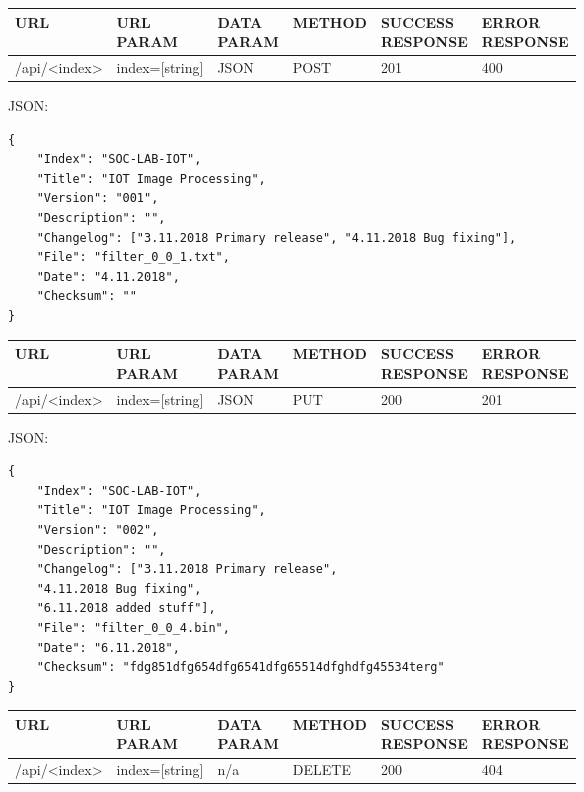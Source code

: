 \begin{table}[h]
    \begin{tabular}[h]{llllll}
    URL          & \specialcell{URL\\PARAM}     & \specialcell{DATA\\PARAM}  & METHOD &  \specialcell{SUCCESS\\RESPONSE} & \specialcell{ERROR\\RESPONSE} \\ \hline
    /api/<index> & index=[string] & JSON    & POST   & 201              & 400            \\ 
    \end{tabular}
\end{table}

JSON:
\begin{verbatim}
{
    "Index": "SOC-LAB-IOT",
    "Title": "IOT Image Processing",
    "Version": "001",
    "Description": "",
    "Changelog": ["3.11.2018 Primary release", "4.11.2018 Bug fixing"],
    "File": "filter_0_0_1.txt",
    "Date": "4.11.2018",
    "Checksum": ""
}	    
\end{verbatim}

\begin{table}[h]
    \begin{tabular}[h]{llllll}
    URL          & \specialcell{URL\\PARAM}     & \specialcell{DATA\\PARAM}  & METHOD &  \specialcell{SUCCESS\\RESPONSE} & \specialcell{ERROR\\RESPONSE} \\ \hline
    /api/<index> & index=[string] & JSON  & PUT    & 200              & 201            \\ 
    \end{tabular}
\end{table}

JSON:
\begin{verbatim}
{
    "Index": "SOC-LAB-IOT",
    "Title": "IOT Image Processing",
    "Version": "002",
    "Description": "",
    "Changelog": ["3.11.2018 Primary release", 
    "4.11.2018 Bug fixing", 
    "6.11.2018 added stuff"],
    "File": "filter_0_0_4.bin",
    "Date": "6.11.2018",
    "Checksum": "fdg851dfg654dfg6541dfg65514dfghdfg45534terg"
}	
\end{verbatim}

\begin{tabular}[h]{llllll}
URL          & \specialcell{URL\\PARAM}     & \specialcell{DATA\\PARAM}  & METHOD &  \specialcell{SUCCESS\\RESPONSE} & \specialcell{ERROR\\RESPONSE} \\ \hline
/api/<index> & index=[string] & n/a        & DELETE & 200              & 404            \\ 
\end{tabular}

